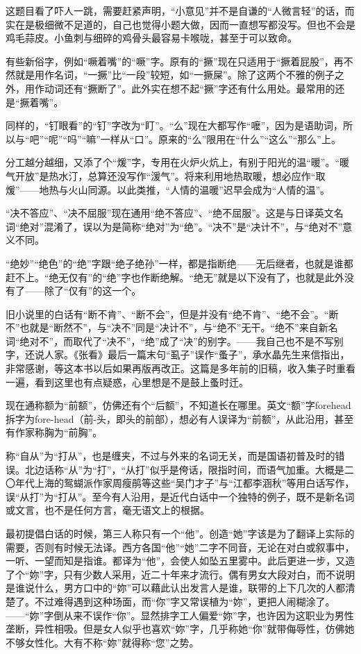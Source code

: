 \par 这题目看了吓人一跳，需要赶紧声明，“小意见”并不是自谦的“人微言轻”的话，而实在是极细微不足道的，自己也觉得小题大做，因而一直想写都没写。但也不会是鸡毛蒜皮。小鱼刺与细碎的鸡骨头最容易卡喉咙，甚至于可以致命。
\par 有些新俗字，例如“噘着嘴”的“噘”字。原有的“撅”现在只适用于“撅着屁股”，再不然就是用作名词，“一撅”比“一段”较短，如“一撅屎”。除了这两个不雅的例子之外，用作动词还有“撅断了”。此外实在想不起“撅”字还有什么用处。最常用的还是“撅着嘴”。
\par 同样的，“钉眼看”的“钉”字改为“盯”。“么”现在大都写作“嚒”，因为是语助词，所以与“吧”“呢”“吗”“嘛”一样从“口”。原来的“么”限用在“什么”“这么”“那么”上。
\par 分工越分越细，又添了个“煖”字，专用在火炉火炕上，有别于阳光的温“暖”。“暖气开放”是热水汀，总算还没写作“湲气”。将来利用地热取暖，想必应作“取煖”——地热与火山同源。以此类推，“人情的温暖”迟早会成为“人情的温”。
\par “决不答应”、“决不屈服”现在通用“绝不答应”、“绝不屈服”。这是与日译英文名词“绝对”混淆了，误以为是简称“绝对”为“绝”。“决不”是“决计不”，与“绝对不”意义不同。
\par “绝妙”“绝色”的“绝”字跟“绝子绝孙”一样，都是指断绝——无后继者，也就是谁都赶不上。“绝无仅有”的“绝”字也作断绝解。“绝无”就是以下没有了，也就是此外没有了——除了“仅有”的这一个。
\par 旧小说里的白话有“断不肯”、“断不会”，但是并没有“绝不肯”、“绝不会”。“断不”也就是“断然不”，与“决不”同是“决计不”，与“绝不”无干。“绝不”来自新名词“绝对不”，而取代了“决不”，“绝”成了“决”的别字。——我自己也不是不写别字，还说人家。《张看》最后一篇末句“虱子”误作“蚤子”，承水晶先生来信指出，非常感谢，等这本书以后如果再版再改正。这篇是多年前的旧稿，收入集子时重看一遍，看到这里也有点疑惑，心里想是不是鼓上蚤时迁。
\par 现在通称额为“前额”，仿佛还有个“后额”，不知道长在哪里。英文“额”字forehead拆字为fore-head（前-头，即头的前部），想必有人误译为“前额”，从此沿用，甚至有作家称胸为“前胸”。
\par 称“自从”为“打从”，也是缠夹，不过与外来的名词无关，而是国语初普及时的错误。北边话称“从”为“打”，“从打”似乎是侉话，限指时间，而语气加重。大概是二〇年代上海的鸳蝴派作家周瘦鹃等这些“吴门才子”与“江都李涵秋”等用白话写作，误“从打”为“打从”。至今有人沿用，是近代白话中一个独特的例子，既不是新名词或文言，也不是任何方言，毫无语文上的根据。
\par 最初提倡白话的时候，第三人称只有一个“他”。创造“她”字该是为了翻译上实际的需要，否则有时候无法译。西方各国“他”“她”二字不同音，无论在对白或叙事中，一听、一望而知是指谁。都译为“他”，会使人如坠五里雾中。此后更进一步，又造了个“妳”字，只有少数人采用，近二十年来才流行。偶有男女大段对白，而不说明是谁说什么，男方口中的“妳”可以藉此认出发言人是谁，联带的上下几次的人都清楚了。不过难得遇到这种场面，而“你”字又常误植为“妳”，更把人闹糊涂了。——“妳”字倒从来不误作“你”。显然排字工人偏爱“妳”字，也许因为这职业为男性垄断，异性相吸。但是女人似乎也喜欢“妳”字，几乎称她“你”就带侮辱性，仿佛她不够女性化。大有不称“妳”就得称“您”之势。
